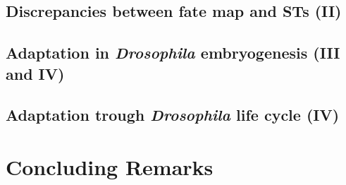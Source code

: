 \documentclass[officiallayout]{tktla_modified}
\begin{document}
%	

\section{Discrepancies between fate map and STs (II)}
	

\section{Adaptation in \textit{Drosophila} embryogenesis (III and IV)}
	
\section{Adaptation trough \textit{Drosophila} life cycle (IV)}
	
	\clearpage




\chapter{Concluding Remarks}

\clearpage

%

\begin{multicols}{2}
{\footnotesize

}
\end{multicols}

\end{document}
